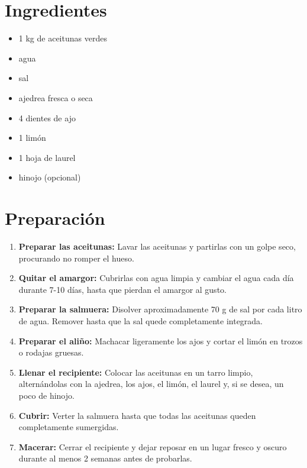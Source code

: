 
    \begin{minipage}[t]{0.35\textwidth}
        \section*{Ingredientes}
        \begin{itemize}[leftmargin=*]
            \item 1 kg de aceitunas verdes
            \item agua
            \item sal
            \item ajedrea fresca o seca
            \item 4 dientes de ajo
            \item 1 limón
            \item 1 hoja de laurel
            \item hinojo (opcional)
        \end{itemize}
    \end{minipage}
    \hfill
    \begin{minipage}[t]{0.6\textwidth}
        \section*{Preparación}
        \begin{enumerate}
            \item \textbf{Preparar las aceitunas:} Lavar las aceitunas y partirlas con un golpe seco, procurando no romper el hueso.
            \item \textbf{Quitar el amargor:} Cubrirlas con agua limpia y cambiar el agua cada día durante 7-10 días, hasta que pierdan el amargor al gusto.
            \item \textbf{Preparar la salmuera:} Disolver aproximadamente 70 g de sal por cada litro de agua. Remover hasta que la sal quede completamente integrada.
            \item \textbf{Preparar el aliño:} Machacar ligeramente los ajos y cortar el limón en trozos o rodajas gruesas.
            \item \textbf{Llenar el recipiente:} Colocar las aceitunas en un tarro limpio, alternándolas con la ajedrea, los ajos, el limón, el laurel y, si se desea, un poco de hinojo.
            \item \textbf{Cubrir:} Verter la salmuera hasta que todas las aceitunas queden completamente sumergidas.
            \item \textbf{Macerar:} Cerrar el recipiente y dejar reposar en un lugar fresco y oscuro durante al menos 2 semanas antes de probarlas.
        \end{enumerate}
    \end{minipage}

